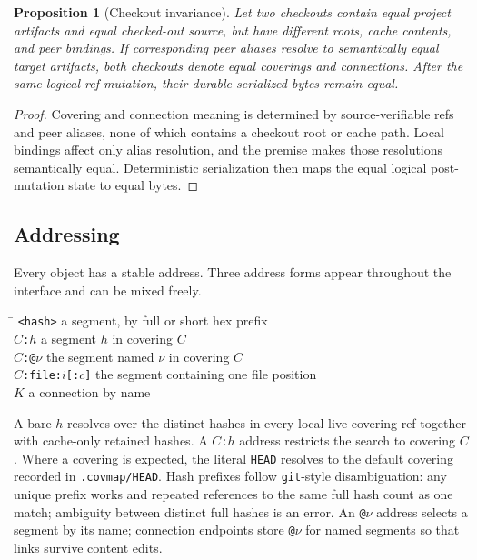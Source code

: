 \documentclass[11pt,a4paper]{article}
\newtheorem{proposition}[definition]{Proposition}
\begin{document}
\begin{proposition}[Checkout invariance]\label{prop:checkout-invariance}
Let two checkouts contain equal project artifacts and equal checked-out source,
but have different roots, cache contents, and peer bindings. If corresponding
peer aliases resolve to semantically equal target artifacts, both checkouts
denote equal coverings and connections. After the same logical ref mutation,
their durable serialized bytes remain equal.
\end{proposition}
\begin{proof}
Covering and connection meaning is determined by source-verifiable refs and
peer aliases, none of which contains a checkout root or cache path. Local
bindings affect only alias resolution, and the premise makes those resolutions
semantically equal. Deterministic serialization then maps the equal logical
post-mutation state to equal bytes.
\end{proof}

\subsection{Addressing}

Every object has a stable address. Three address forms appear
throughout the interface and can be mixed freely.

\begin{tabbing}
\hspace{4.2cm}\=\kill
\texttt{<hash>}            \> a segment, by full or short hex prefix\\
\texttt{$C$:$h$}           \> a segment $h$ in covering $C$\\
\texttt{$C$:@$\nu$}        \> the segment named $\nu$ in covering $C$\\
\texttt{$C$:file:$i$[:$c$]} \> the segment containing one file position\\
\texttt{$K$}               \> a connection by name
\end{tabbing}

A bare \texttt{$h$} resolves over the distinct hashes in every local live
covering ref together with cache-only retained hashes. A
\texttt{$C$:$h$} address restricts the search to covering $C$. Where a
covering is expected, the literal \texttt{HEAD} resolves to the default
covering recorded in \texttt{.covmap/HEAD}. Hash prefixes follow
\texttt{git}-style disambiguation: any unique prefix works and repeated
references to the same full hash count as one match; ambiguity between
distinct full hashes is an error. An \texttt{@$\nu$} address selects a segment
by its name; connection endpoints store \texttt{@$\nu$} for named segments so
that links survive content edits.
\end{document}
